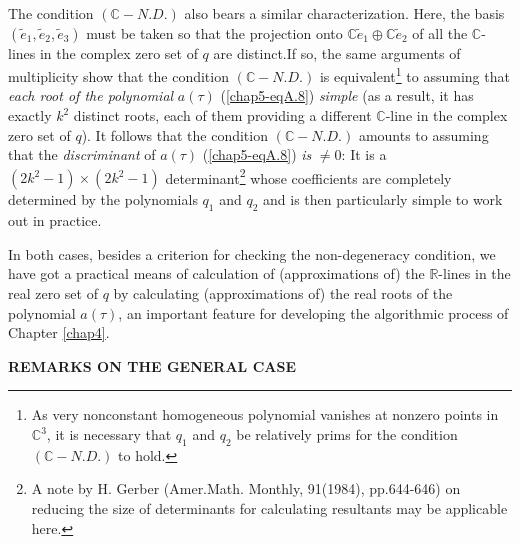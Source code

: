 The condition $(\mathbb{C}-N.D.)$ also bears a similar characterization. Here, the basis $(\widetilde{e}_{1}, \widetilde{e}_{2}, \widetilde{e}_{3})$ must be taken so that the projection onto $\mathbb{C} \widetilde{e}_{1} \oplus \mathbb{C} \widetilde{e}_{2}$ of all the $\mathbb{C}$-lines in the complex zero set of $q$ are distinct.\pageoriginale If so, the same arguments of multiplicity show that the condition $(\mathbb{C}-N.D.)$ is equivalent\footnote{As very nonconstant homogeneous polynomial vanishes at nonzero points in $\mathbb{C}^{3}$, it is necessary that $q_{1}$ and $q_{2}$ be relatively prims for the condition $(\mathbb{C}-N.D.)$ to hold.}  to assuming that {\em each root of the polynomial} $a(\tau)$ (\ref{chap5-eqA.8}) {\em simple} (as a result, it has exactly $k^{2}$ distinct roots, each of them providing a different $\mathbb{C}$-line in the complex zero set of $q$). It follows that the condition $(\mathbb{C}-N.D.)$ amounts to assuming that the {\em discriminant} of $a(\tau)$ (\ref{chap5-eqA.8}) {\em is} $\neq 0$: It is a $(2k^{2} - 1) \times (2k^{2} - 1)$ determinant\footnote{A note by H. Gerber (Amer.Math. Monthly, 91(1984), pp.644-646) on reducing the size of determinants for calculating resultants may be applicable here.} whose coefficients are completely determined by the polynomials $q_{1}$ and $q_{2}$ and is then particularly simple to work out in practice.

In both cases, besides a criterion for checking the non-degeneracy condition, we have got a practical means of calculation of (approximations of) the $\mathbb{R}$-lines in the real zero set of $q$ by calculating (approximations of) the real roots of the polynomial $a(\tau)$, an important feature for developing the algorithmic process of Chapter \ref{chap4}.

\begin{center}   
\textbf{ REMARKS ON THE GENERAL CASE}
\end{center}

